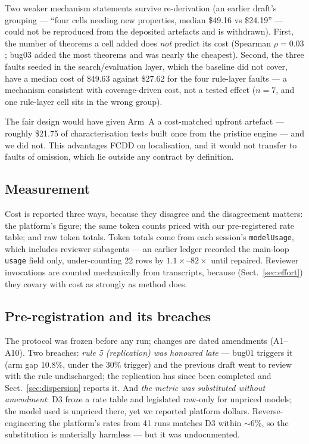 \documentclass[runningheads]{llncs}
\begin{document}
Two weaker mechanism statements survive re-derivation (an earlier draft's
grouping --- ``four cells needing new properties, median \$49.16 vs \$24.19''
--- could not be reproduced from the deposited artefacts and is withdrawn).
First, the number of theorems a cell added does \emph{not} predict its cost
(Spearman $\rho=0.03$; bug03 added the most theorems and was nearly the
cheapest). Second, the three faults seeded in the search/evaluation layer,
which the baseline did not cover, have a median cost of \$49.63 against
\$27.62 for the four rule-layer faults --- a mechanism consistent with
coverage-driven cost, not a tested effect ($n=7$, and one rule-layer cell
sits in the wrong group).

The fair design would have given Arm~A a cost-matched upfront artefact ---
roughly \$21.75 of characterisation tests built once from the pristine engine
--- and we did not. This advantages FCDD on localisation, and it would not
transfer to faults of omission, which lie outside any contract by definition.

\subsection{Measurement}
Cost is reported three ways, because they disagree and the disagreement
matters: the platform's figure; the same token counts priced with our
pre-registered rate table; and raw token totals. Token totals come from each
session's \texttt{modelUsage}, which includes reviewer subagents --- an
earlier ledger recorded the main-loop \texttt{usage} field only,
under-counting 22 rows by $1.1\times$--$82\times$ until repaired. Reviewer
invocations are counted mechanically from transcripts, because
(Sect.~\ref{sec:effort}) they covary with cost as strongly as method does.

\subsection{Pre-registration and its breaches}
The protocol was frozen before any run; changes are dated amendments
(A1--A10). Two breaches: \emph{rule 5 (replication) was honoured late} ---
bug01 triggers it (arm gap 10.8\%, under the 30\% trigger) and the previous
draft went to review with the rule undischarged; the replication has since
been completed and Sect.~\ref{sec:dispersion} reports it. And \emph{the
metric was substituted without amendment}: D3 froze a rate table and
legislated raw-only for unpriced models; the model used is unpriced there,
yet we reported platform dollars. Reverse-engineering the platform's rates
from 41 runs matches D3 within $\sim$6\%, so the substitution is materially
harmless --- but it was undocumented.
\end{document}
